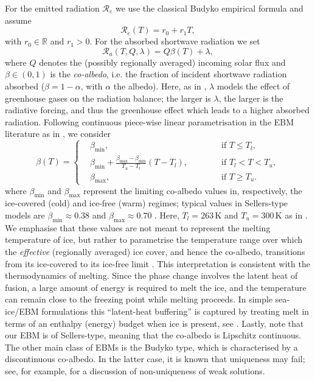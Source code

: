 \documentclass[10pt]{amsart}
\numberwithin{equation}{section}
\begin{document}
For the emitted radiation $\mathcal{R}_e$ we use the classical Budyko empirical formula \cite{Budyko1969,North17} and assume
$$
\mathcal{R}_e(T)=r_0+r_1T,
$$ 
with $r_0 \in \mathbb{R}$ and $r_1 >0$. For the absorbed shortwave radiation we set
$$
\mathcal{R}_a(T,Q,\lambda )=Q \beta(T)+ \lambda ,
$$
where $Q$ denotes the (possibly regionally averaged) incoming solar flux and $\beta\in(0,1)$ is the
\emph{co-albedo}, i.e. the fraction of incident shortwave radiation absorbed ($\beta=1-\alpha$, with
$\alpha$ the albedo). Here, as in \cite{DelSartoNPG,Bastiaansen2022}, $\lambda$ models the effect of greenhouse gases on the radiation balance; the larger is $\lambda$, the larger is the radiative forcing, and thus the greenhouse effect which leads to a higher absorbed radiation. Following continuous piece-wise linear parametrisation in the EBM literature as in \cite{RomboutsGhil2015}, we consider
\begin{equation}
\beta(T) =\left \lbrace
    \begin{aligned}
    &\beta_{\mathrm{min}}, &\qquad & \text{ if } T \leq T_{l},\\
    &\beta_{\mathrm{min}} + \frac{\beta_{ \mathrm{max}}- \beta_{ \mathrm{min}}}{T_u - T_l} (T- T_l), &\qquad &\text{ if } T_l < T< T_{u}, \\
    &\beta_{ \mathrm{max}}, &\qquad & \text{ if } T \geq T_{u}.
    \end{aligned}
    \right.
    \label{eq: piecewise co-albedo}
\end{equation}
where $\beta_{\mathrm{min}}$ and $\beta_{\mathrm{max}}$ represent the limiting co-albedo values in, respectively, the ice-covered (cold) and ice-free
(warm) regimes; typical values in Sellers-type models are $\beta_{\min}\approx 0.38$ and $\beta_{\max}\approx
0.70$ \cite{North1981}. Here, $T_l = 263\,\mathrm{K}$ and $T_u = 300\,\mathrm{K}$ as in \cite{RomboutsGhil2015}. 
We emphasise that these values are not meant to represent the melting temperature of ice, but rather to parametrise the temperature range over which the \emph{effective} (regionally averaged) ice cover, and hence the co-albedo, transitions from its ice-covered to its ice-free limit \cite{North1981,RomboutsGhil2015}. 
This interpretation is consistent with the thermodynamics of melting. Since the phase change involves the latent heat of fusion, a large amount of energy is required to melt the ice, and the temperature can remain close to the freezing point while melting proceeds. In simple sea-ice/EBM formulations this “latent-heat buffering” is captured by treating melt in terms of an enthalpy (energy) budget when ice is present, see \cite{Eisenman,Eisenman2012}. Lastly, note that our EBM is of Sellers-type, meaning that the co-albedo is Lipschitz continuous. The other main class of EBMs is the Budyko type, which is characterised by a discontinuous co-albedo. In the latter case, it is known that uniqueness may fail; see, for example, \cite{Diaz97} for a discussion of non-uniqueness of weak solutions.
\end{document}
